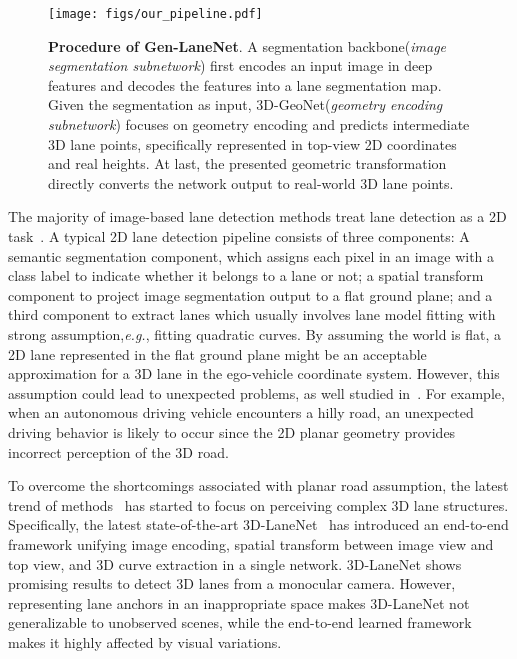 \documentclass[10pt,twocolumn,letterpaper]{article}
\begin{document}
\begin{figure}[!h]
    \centering
    \texttt{[image: figs/our\_pipeline.pdf]}
    \caption{ \small {\bf Procedure of Gen-LaneNet}. A segmentation backbone({\em image segmentation subnetwork}) first encodes an input image in deep features and decodes the features into a lane segmentation map. Given the segmentation as input, 3D-GeoNet({\em geometry encoding subnetwork}) focuses on geometry encoding and predicts intermediate 3D lane points, specifically represented in top-view 2D coordinates and real heights. At last, the presented geometric transformation directly converts the network output to real-world 3D lane points.}
  \label{fig:our:pipeline}
  \vspace{-6mm}
\end{figure}







The majority of image-based lane detection methods treat lane detection as a 2D task~\cite{Tusimple2018,CityScapes2016,Pan:etal:AAAI2018}. A typical 2D lane detection pipeline consists of three components: A semantic segmentation component, which assigns each pixel in an image with a class label to indicate whether it belongs to a lane or not; a spatial transform component to project image segmentation output to a flat ground plane; and a third component to extract lanes which usually involves lane model fitting with strong assumption,{\it e.g.}, fitting quadratic curves. By assuming the world is flat, a 2D lane represented in the flat ground plane might be an acceptable approximation for a 3D lane in the ego-vehicle coordinate system. However, this assumption could lead to unexpected problems, as well studied in~\cite{Garnett:etal:ICCV2019,MultiSensor2019}. For example, when an autonomous driving vehicle encounters a hilly road, an unexpected driving behavior is likely to occur since the 2D planar geometry provides incorrect perception of the 3D road.

To overcome the shortcomings associated with planar road assumption, the latest trend of methods~\cite{YawPitchRool2002,3DLaneStereo2004,MultiSensor2019,Garnett:etal:ICCV2019} has started to focus on perceiving complex 3D lane structures. Specifically, the latest state-of-the-art 3D-LaneNet~\cite{Garnett:etal:ICCV2019} has introduced an end-to-end framework unifying image encoding, spatial transform between image view and top view, and 3D curve extraction in a single network. 3D-LaneNet shows promising results to detect 3D lanes from a monocular camera. However, representing lane anchors in an inappropriate space makes 3D-LaneNet not generalizable to unobserved scenes, while the end-to-end learned framework makes it highly affected by visual variations.
\end{document}
